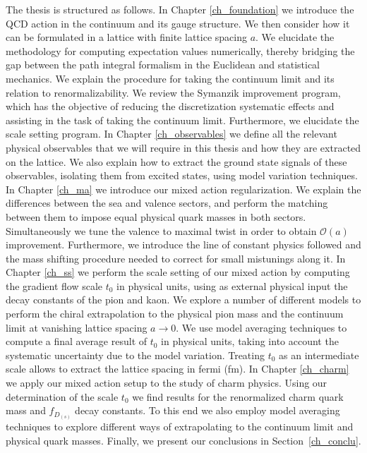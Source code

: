 The thesis is structured as follows. In Chapter \ref{ch_foundation} we introduce the QCD action in the continuum and its gauge structure. We then consider how it can be formulated in a lattice with finite lattice spacing $a$. We elucidate the methodology for computing expectation values numerically, thereby bridging the gap between the path integral formalism in the Euclidean and statistical mechanics. We explain the procedure for taking the continuum limit and its relation to renormalizability. We review the Symanzik improvement program, which has the objective of reducing the discretization systematic effects and assisting in the task of taking the continuum limit. Furthermore, we elucidate the scale setting program. In Chapter \ref{ch_observables} we define all the relevant physical observables that we will require in this thesis and how they are extracted on the lattice. We also explain how to extract the ground state signals of these observables, isolating them from excited states, using model variation techniques. In Chapter \ref{ch_ma} we introduce our mixed action regularization. We explain the differences between the sea and valence sectors, and perform the matching between them to impose equal physical quark masses in both sectors. Simultaneously we tune the valence to maximal twist in order to obtain $\mathcal{O}(a)$ improvement. Furthermore, we introduce the line of constant physics followed and the mass shifting procedure needed to correct for small mistunings along it. In Chapter \ref{ch_ss} we perform the scale setting of our mixed action by computing the gradient flow scale $t_0$ in physical units, using as external physical input the decay constants of the pion and kaon. We explore a number of different models to perform the chiral extrapolation to the physical pion mass and the continuum limit at vanishing lattice spacing $a\to0$. We use model averaging techniques to compute a final average result of $t_0$ in physical units, taking into account the systematic uncertainty due to the model variation. Treating $t_0$ as an intermediate scale allows to extract the lattice spacing in fermi (fm). In Chapter \ref{ch_charm} we apply our mixed action setup to the study of charm physics. Using our determination of the scale $t_0$ we find results for the renormalized charm quark mass and $f_{D_{(s)}}$ decay constants. To this end we also employ model averaging techniques to explore different ways of extrapolating to the continuum limit and physical quark masses. Finally, we present our conclusions in Section~\ref{ch_conclu}.

